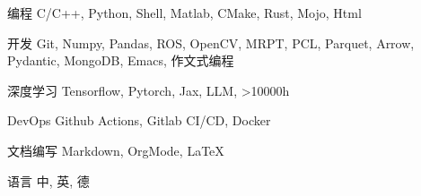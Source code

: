 \documentclass[../cv_cn.tex]{subfiles}
\begin{document}


\begin{cvskills}

  \cvskill
    {编程} %
    {C/C++, Python, Shell, Matlab, CMake, Rust, Mojo, Html} %

  \cvskill
    {开发} %
    {Git, Numpy, Pandas, ROS, OpenCV, MRPT, PCL, Parquet, Arrow, Pydantic, MongoDB, Emacs, 作文式编程} %

  \cvskill
    {深度学习} %
    {Tensorflow, Pytorch, Jax, LLM, >10000h} %

  \cvskill
    {DevOps} %
    {Github Actions, Gitlab CI/CD, Docker} %

  \cvskill
    {文档编写} %
    {Markdown, OrgMode, LaTeX} %

  \cvskill
    {语言} %
    {中, 英, 德} %

\end{cvskills}
\end{document}
